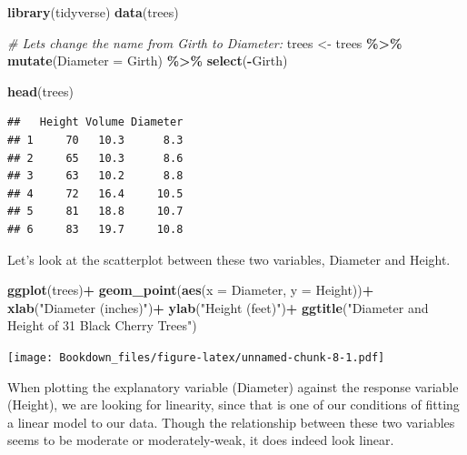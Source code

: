 \documentclass[
]{book}
\newenvironment{Shaded}{\begin{snugshade}}{\end{snugshade}}
\newcommand{\CommentTok}[1]{\textcolor[rgb]{0.56,0.35,0.01}{\textit{#1}}}
\newcommand{\DataTypeTok}[1]{\textcolor[rgb]{0.13,0.29,0.53}{#1}}
\newcommand{\KeywordTok}[1]{\textcolor[rgb]{0.13,0.29,0.53}{\textbf{#1}}}
\newcommand{\NormalTok}[1]{#1}
\newcommand{\OperatorTok}[1]{\textcolor[rgb]{0.81,0.36,0.00}{\textbf{#1}}}
\newcommand{\StringTok}[1]{\textcolor[rgb]{0.31,0.60,0.02}{#1}}
\begin{document}
\begin{Shaded}
\begin{Highlighting}[]
\KeywordTok{library}\NormalTok{(tidyverse)}
\KeywordTok{data}\NormalTok{(trees)}

\CommentTok{\# Let\textquotesingle{}s change the name from Girth to Diameter:}
\NormalTok{trees \textless{}{-}}\StringTok{ }\NormalTok{trees }\OperatorTok{\%\textgreater{}\%}
\StringTok{  }\KeywordTok{mutate}\NormalTok{(}\DataTypeTok{Diameter =}\NormalTok{ Girth) }\OperatorTok{\%\textgreater{}\%}
\StringTok{  }\KeywordTok{select}\NormalTok{(}\OperatorTok{{-}}\NormalTok{Girth)}

\KeywordTok{head}\NormalTok{(trees)}
\end{Highlighting}
\end{Shaded}

\begin{verbatim}
##   Height Volume Diameter
## 1     70   10.3      8.3
## 2     65   10.3      8.6
## 3     63   10.2      8.8
## 4     72   16.4     10.5
## 5     81   18.8     10.7
## 6     83   19.7     10.8
\end{verbatim}

Let's look at the scatterplot between these two variables, Diameter and Height.

\begin{Shaded}
\begin{Highlighting}[]
\KeywordTok{ggplot}\NormalTok{(trees)}\OperatorTok{+}
\StringTok{  }\KeywordTok{geom\_point}\NormalTok{(}\KeywordTok{aes}\NormalTok{(}\DataTypeTok{x =}\NormalTok{ Diameter, }\DataTypeTok{y =}\NormalTok{  Height))}\OperatorTok{+}
\StringTok{  }\KeywordTok{xlab}\NormalTok{(}\StringTok{"Diameter (inches)"}\NormalTok{)}\OperatorTok{+}
\StringTok{  }\KeywordTok{ylab}\NormalTok{(}\StringTok{"Height (feet)"}\NormalTok{)}\OperatorTok{+}
\StringTok{  }\KeywordTok{ggtitle}\NormalTok{(}\StringTok{"Diameter and Height of 31 Black Cherry Trees"}\NormalTok{)}
\end{Highlighting}
\end{Shaded}

\texttt{[image: Bookdown\_files/figure-latex/unnamed-chunk-8-1.pdf]}

When plotting the explanatory variable (Diameter) against the response variable (Height), we are looking for linearity, since that is one of our conditions of fitting a linear model to our data. Though the relationship between these two variables seems to be moderate or moderately-weak, it does indeed look linear.
\end{document}
